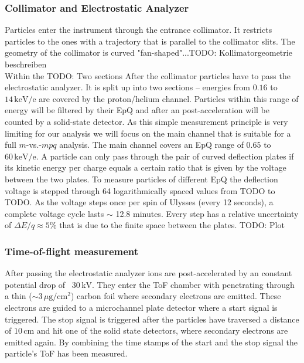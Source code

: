 \subsubsection{Collimator and Electrostatic Analyzer}
\label{sec:EpQ}
Particles enter the instrument through the entrance collimator. It restricts particles to the ones with a trajectory that is parallel to the collimator slits. The geometry of the collimator is curved "fan-shaped"...TODO: Kollimatorgeometrie beschreiben \\
Within the TODO: Two sections
After the collimator particles have to pass the electrostatic analyzer. It is split up into two sections -- energies from $0.16$ to $14\,\mathrm{keV/e}$ are covered by the proton/helium channel. Particles within this range of energy will be filtered by their EpQ and after an post-acceleration will be counted by a solid-state detector. 
As this simple measurement principle is very limiting for our analysis we will focus on the main channel that is suitable for a full $m$-vs.-$mpq$ analysis.
The main channel covers an EpQ range of $0.65$ to $60\,\mathrm{keV/e}$. A particle can only pass through the pair of curved deflection plates if its kinetic energy per charge equals a certain ratio that is given by the voltage between the two plates. To measure particles of different EpQ the deflection voltage is stepped through 64 logarithmically spaced values from TODO to TODO. As the voltage steps once per spin of Ulysses (every 12 seconds), a complete voltage cycle lasts $\sim$ 12.8 minutes. 
Every step has a relative uncertainty of $\Delta E/q \approx 5\%$ that is due to the finite space between the plates. TODO: Plot
  
\subsubsection{Time-of-flight measurement}
After passing the electrostatic analyzer ions are post-accelerated by an constant potential drop of ~$30\,\mathrm{kV}$. They enter the ToF chamber with penetrating through a thin ($\sim 3\,\mu \mathrm{g / cm^2}$) carbon foil where secondary electrons are emitted. These electrons are guided to a microchannel plate detector where a start signal is triggered. The stop signal is triggered after the particles have traversed a distance of $10\,\mathrm{cm}$ and hit one of the solid state detectors, where secondary electrons are emitted again. By combining the time stamps of the start and the stop signal the particle's ToF has been measured.
